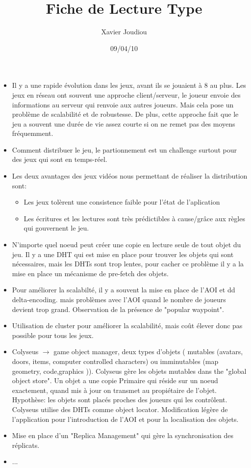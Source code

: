 \documentclass[11pt,a4paper]{article}
\title{Fiche de Lecture Type}
\author{Xavier Joudiou}
\date{09/04/10}
\begin{document}
	
  \begin{itemize}
  \renewcommand{\labelitemi}{$\Rightarrow$}
	\item Il y a une rapide évolution dans les jeux, avant ils se jouaient à 8 au plus. Les jeux en réseau ont souvent une approche client/serveur, le joueur envoie des informations au serveur qui renvoie aux autres joueurs. Mais cela pose un problème de scalabilité et de robustesse. De plus, cette approche fait que le jeu a souvent une durée de vie assez courte si on ne remet pas des moyens fréquemment.
	\item Comment distribuer le jeu, le partionnement est un challenge surtout pour des jeux qui sont en temps-réel.
	\item Les deux avantages des jeux vidéos nous permettant de réaliser la distribution sont:
	\begin{itemize}
		\item Les jeux tolèrent une consistence faible pour l'état de l'aplication
		\item Les écritures et les lectures sont très prédictibles à cause/grâce aux règles qui gouvernent le jeu.
	\end{itemize}
	\item N'importe quel noeud peut créer une copie en lecture seule de tout objet du jeu. Il y a une DHT qui est mise en place pour trouver les objets qui sont nécessaires, mais les DHTs sont trop lentes, pour cacher ce problème il y a la mise en place un mécanisme de pre-fetch des objets. 
	\item Pour améliorer la scalabilté, il y a souvent la mise en place de l'AOI et dd delta-encoding. mais problèmes avec l'AOI quand le nombre de joueurs devient trop grand. Observation de la présence de "popular waypoint".
	\item Utilisation de cluster pour améliorer la scalabilité, mais coût élever donc pas possible pour tous les jeux.
	\item Colyseus $\rightarrow$ game object manager, deux types d'objets ( mutables (avatars, doors, items, computer controlled characters) ou imminutables (map geometry, code,graphics  )). Colyseus gère les objets mutables dans the "global object store". Un objet a une copie Primaire qui réside sur un noeud exactement, quand mis à jour on transmet au propiétaire de l'objet. Hypothèse: les objets sont placés proches des joueurs qui les contrôlent. Colyseus utilise des DHTs comme object locator. Modification légère de l'application pour l'introduction de l'AOI et pour la localisation des objets.
	\item Mise en place d'un "Replica Management" qui gère la synchronisation des réplicats.
	\item ...
  \end{itemize}
\end{document}
